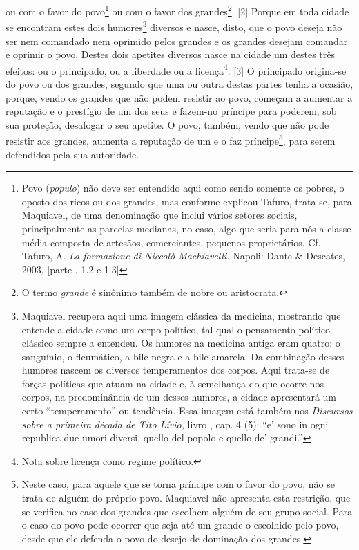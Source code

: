 ou com o favor do povo\footnote{Povo (\emph{populo}) não deve ser
  entendido aqui como sendo somente os pobres, o oposto dos ricos ou dos
  grandes, mas conforme explicou Tafuro, trata-se, para Maquiavel, de
  uma denominação que inclui vários setores sociais, principalmente as
  parcelas medianas, no caso, algo que seria para nós a classe média
  composta de artesãos, comerciantes, pequenos proprietários. Cf.
  Tafuro, A. \emph{La formazione di Niccolò Machiavelli.} Napoli: Dante
  \& Descates, 2003, {[}parte , 1.2 e 1.3{]}} ou com o favor dos
grandes\footnote{O termo \emph{grande} é sinônimo também de nobre ou
  aristocrata.}. {[}2{]} Porque em toda cidade se encontram estes dois
humores\footnote{Maquiavel recupera aqui uma imagem clássica da
  medicina, mostrando que entende a cidade como um corpo político, tal
  qual o pensamento político clássico sempre a entendeu. Os humores na
  medicina antiga eram quatro: o sanguínio, o fleumático, a bile negra e
  a bile amarela. Da combinação desses humores nascem os diversos
  temperamentos dos corpos. Aqui trata-se de forças políticas que atuam
  na cidade e, à semelhança do que ocorre nos corpos, na predominância
  de um desses humores, a cidade apresentará um certo ``temperamento''
  ou tendência. Essa imagem está também nos \emph{Discursos sobre a
  primeira década de Tito Lívio,} livro , cap. 4 (5): ``e' sono in ogni
  republica due umori diversi, quello del popolo e quello de' grandi.''}
diversos e nasce, disto, que o povo deseja não ser nem comandado nem
oprimido pelos grandes e os grandes desejam comandar e oprimir o povo.
Destes dois apetites diversos nasce na cidade um destes três efeitos: ou
o principado, ou a liberdade ou a licença\footnote{Nota sobre licença
  como regime político.}. {[}3{]} O principado origina-se do povo ou dos
grandes, segundo que uma ou outra destas partes tenha a ocasião, porque,
vendo os grandes que não podem resistir ao povo, começam a aumentar a
reputação e o prestígio de um dos seus e fazem-no príncipe para poderem,
sob sua proteção, desafogar o seu apetite. O povo, também, vendo que não
pode resistir aos grandes, aumenta a reputação de um e o faz
príncipe\footnote{Neste caso, para aquele que se torna príncipe com o
  favor do povo, não se trata de alguém do próprio povo. Maquiavel não
  apresenta esta restrição, que se verifica no caso dos grandes que
  escolhem alguém de seu grupo social. Para o caso do povo pode ocorrer
  que seja até um grande o escolhido pelo povo, desde que ele defenda o
  povo do desejo de dominação dos grandes.}, para serem defendidos pela
sua autoridade.

